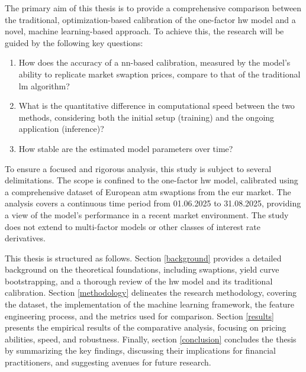 The primary aim of this thesis is to provide a comprehensive comparison between the traditional, optimization-based calibration of the one-factor \ac{hw} model and a novel, machine learning-based approach. To achieve this, the research will be guided by the following key questions:
\begin{enumerate}
	\item How does the accuracy of a \ac{nn}-based calibration, measured by the model's ability to replicate market swaption prices, compare to that of the traditional \ac{lm} algorithm?
	\item What is the quantitative difference in computational speed between the two methods, considering both the initial setup (training) and the ongoing application (inference)?
	\item How stable are the estimated model parameters over time?
\end{enumerate}

To ensure a focused and rigorous analysis, this study is subject to several delimitations. The scope is confined to the one-factor \ac{hw} model, calibrated using a comprehensive dataset of European \ac{atm} swaptions from the \ac{eur} market. The analysis covers a continuous time period from 01.06.2025 to 31.08.2025, providing a view of the model's performance in a recent market environment. The study does not extend to multi-factor models or other classes of interest rate derivatives.

This thesis is structured as follows. Section \ref{background} provides a detailed background on the theoretical foundations, including swaptions, yield curve bootstrapping, and a thorough review of the \ac{hw} model and its traditional calibration. Section \ref{methodology} delineates the research methodology, covering the dataset, the implementation of the machine learning framework, the feature engineering process, and the metrics used for comparison. Section \ref{results} presents the empirical results of the comparative analysis, focusing on pricing abilities, speed, and robustness. Finally, section \ref{conclusion} concludes the thesis by summarizing the key findings, discussing their implications for financial practitioners, and suggesting avenues for future research.